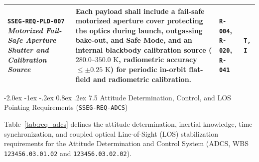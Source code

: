 \documentclass[11pt,a4paper]{article}
\makeatletter
\renewcommand\subsubsection{\@startsection{subsubsection}{3}{\z@}%
    {-2.0ex \@plus -1ex \@minus -.2ex}%
    {0.8ex \@plus .2ex}%
    {\normalfont\normalsize\bfseries\sffamily\color{SubHeadingBlue}}}
\providecommand{\abbr}[1]{#1}
\makeatother
\begin{document}
{\begin{longtable}{|>{\raggedright\arraybackslash}p{}|>{\raggedright\arraybackslash}p{}|>{\raggedright\arraybackslash}p{}|>{\raggedright\arraybackslash}p{}|}
\textbf{\texttt{SSEG-REQ-PLD-007}} \newline \emph{Motorized Fail-Safe Aperture Shutter and Calibration Source} & Each payload \textbf{shall} include a fail-safe motorized aperture cover protecting the optics during launch, outgassing bake-out, and Safe Mode, and an internal blackbody calibration source ($280.0\text{--}350.0\text{ K}$, radiometric accuracy $\le \pm 0.25\text{ K}$) for periodic in-orbit flat-field and radiometric calibration. & \texttt{R-004}, \texttt{R-020}, \texttt{R-041} & \texttt{T, I} \\ \hline
\end{longtable}}

\subsubsection{7.5 Attitude Determination, Control, and LOS Pointing Requirements (\texttt{SSEG-REQ-ADCS})}

Table~\ref{tab:req_adcs} defines the attitude determination, inertial knowledge, time synchronization, and coupled optical Line-of-Sight (\abbr{LOS}) stabilization requirements for the Attitude Determination and Control System (\abbr{ADCS}, \abbr{WBS} \texttt{123456.03.01.02} and \texttt{123456.03.02.02}).
\end{document}
